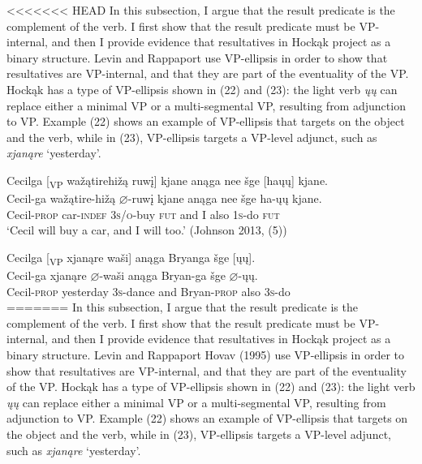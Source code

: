 \documentclass[output=paper]{LSP/langsci}
\begin{document}
\begin{exe}
\begin{exe}
\begin{exe}
\begin{exe}
{<<<<<<< HEAD
In this subsection, I argue that the result predicate is the complement of the verb. I first show that the result predicate must be VP-internal, and then I provide evidence that resultatives in Hockąk project as a binary structure. Levin and Rappaport \citet{Hovav1995} use VP-ellipsis in order to show that resultatives are VP-internal, and that they are part of the eventuality of the VP. Hockąk has a type of VP-ellipsis shown in (22) and (23): the light verb \textit{ųų} can replace either a minimal VP or a multi-segmental VP, resulting from adjunction to VP. Example (22) shows an example of VP-ellipsis that targets on the object and the verb, while in (23), VP-ellipsis targets a VP-level adjunct, such as \textit{xjanąre} `yesterday'.

\begin{exe}

\ex \glll Cecilga [\textsubscript{VP} wažątirehižą ruwį] kjane anąga nee šge [haųų] kjane.\\
Cecil-ga {} wažątire-hižą {$\varnothing$}-ruwį kjane anąga nee šge ha-ųų kjane.\\
Cecil-\textsc{prop} {} car-\textsc{indef} \textsc{3s/o}-buy \textsc{fut} and I also \textsc{1s}-do \textsc{fut}\\
\glt `Cecil will buy a car, and I will too.' (Johnson 2013, (5))

\ex \glll Cecilga [\textsubscript{VP} xjanąre waši] anąga Bryanga šge [ųų].\\
Cecil-ga {} xjanąre {$\varnothing$}-waši anąga Bryan-ga šge {$\varnothing$}-ųų.\\
Cecil-\textsc{prop} {} yesterday \textsc{3s}-dance and Bryan-\textsc{prop} also \textsc{3s}-do\\
=======
In this subsection, I argue that the result predicate is the complement of the verb. I first show that the result predicate must be VP-internal, and then I provide evidence that resultatives in Hock\k{a}k project as a binary structure. Levin and Rappaport Hovav (1995) use VP-ellipsis in order to show that resultatives are VP-internal, and that they are part of the eventuality of the VP. Hock\k{a}k has a type of VP-ellipsis shown in (22) and (23): the light verb \textit{\k{u}\k{u}} can replace either a minimal VP or a multi-segmental VP, resulting from adjunction to VP. Example (22) shows an example of VP-ellipsis that targets on the object and the verb, while in (23), VP-ellipsis targets a VP-level adjunct, such as \textit{xjan\k{a}re} `yesterday'.

\begin{exe}


\end{exe}
\end{exe}}
\end{exe}
\end{exe}
\end{exe}
\end{exe}
\end{document}
